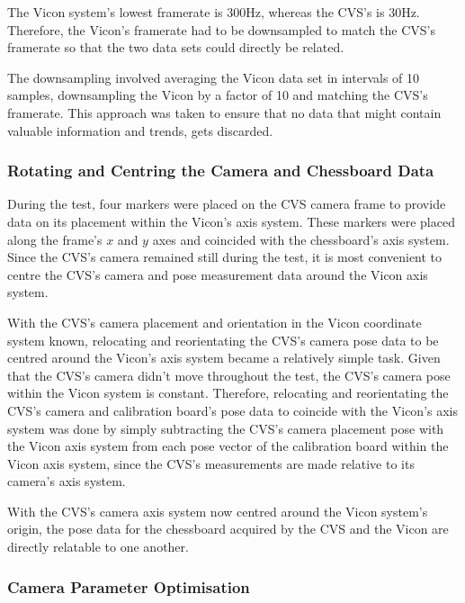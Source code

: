 The Vicon system's lowest framerate is 300Hz, whereas the CVS's is 30Hz. Therefore, the Vicon's framerate had to be downsampled to match the CVS's framerate so that the two data sets could directly be related. 

The downsampling involved averaging the Vicon data set in intervals of 10 samples, downsampling the Vicon by a factor of 10 and matching the CVS's framerate. This approach was taken to ensure that no data that might contain valuable information and trends, gets discarded. 

\subsubsection{Rotating and Centring the Camera and Chessboard Data}
\label{sec:rotate-axes}

During the test, four markers were placed on the CVS camera frame to provide data on its placement within the Vicon's axis system. These markers were placed along the frame's $x$ and $y$ axes and coincided with the chessboard's axis system. Since the CVS's camera remained still during the test, it is most convenient to centre the CVS's camera and pose measurement data around the Vicon axis system. 

With the CVS's camera placement and orientation in the Vicon coordinate system known, relocating and reorientating the CVS's camera pose data to be centred around the Vicon's axis system became a relatively simple task. Given that the CVS's camera didn't move throughout the test, the CVS's camera pose within the Vicon system is constant. Therefore, relocating and reorientating the CVS's camera and calibration board's pose data to coincide with the Vicon's axis system was done by simply subtracting the CVS's camera placement pose with the Vicon axis system from each pose vector of the calibration board within the Vicon axis system, since the CVS's measurements are made relative to its camera's axis system.

With the CVS's camera axis system now centred around the Vicon system's origin, the pose data for the chessboard acquired by the CVS and the Vicon are directly relatable to one another.  

\subsubsection{Camera Parameter Optimisation}
\label{sec:focal-optimisation}

